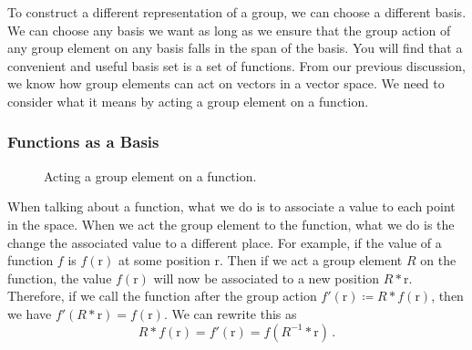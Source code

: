 \documentclass{article}
\theoremstyle{plain}\theoremheaderfont{\normalfont\itshape}\theorembodyfont{\rmfamily}\theoremseparator{.}\newtheorem*{rem}{Remark}\newtheorem*{ex}{Example}\newtheorem*{proof}{Proof}\newtheorem*{altp}{Alternative proof}
\theoremstyle{plain}\theoremheaderfont{\normalfont\bfseries}\theorembodyfont{\rmfamily}\theoremseparator{.}\newtheorem{thm}{Theorem}[section]\newtheorem{lem}[thm]{Lemma}\newtheorem{prop}[thm]{Proposition}\newtheorem*{cor}{Corollary}\newtheorem{defn}[thm]{Definition}\newtheorem{clm}[thm]{Claim}\newtheorem{clminproof}{Claim}\newtheorem*{law}{Law}\newtheorem{pos}[thm]{Postulate}
\theoremstyle{break}\theoremheaderfont{\normalfont\itshape}\theorembodyfont{\rmfamily}\theoremseparator{.\medskip}\newtheorem*{proofskip}{Proof}\newtheorem*{exs}{Examples}\newtheorem*{rems}{Remarks}
\theoremstyle{break}\theoremheaderfont{\normalfont\bfseries}\theorembodyfont{\rmfamily}\theoremseparator{.\medskip}\newtheorem{lemskip}[thm]{Lemma}\newtheorem{defnskip}[thm]{Definition}\newtheorem{propskip}[thm]{Proposition}\newtheorem{thmskip}[thm]{Theorem}
\numberwithin{equation}{section}
\newcommand{\vb}[1]{\bm{\mathrm{#1}}}
\begin{document}
    To construct a different representation of a group, we can choose a different basis. We can choose any basis we want as long as we ensure that the group action of any group element on any basis falls in the span of the basis. You will find that a convenient and useful basis set is a set of functions. From our previous discussion, we know how group elements can act on vectors in a vector space. We need to consider what it means by acting a group element on a function.

    \subsubsection{Functions as a Basis}
    \begin{figure}
        \centering
        \caption{Acting a group element on a function.}
    \end{figure}
    When talking about a function, what we do is to associate a value to each point in the space. When we act the group element to the function, what we do is the change the associated value to a different place. For example, if the value of a function \(f\) is \(f(\vb{r})\) at some position \(\vb{r}\). Then if we act a group element \(R\) on the function, the value \(f(\vb{r})\) will now be associated to a new position \(R*\vb{r}\). Therefore, if we call the function after the group action \(f'(\vb{r})\coloneqq R*f(\vb{r})\), then we have \(f'(R*\vb{r})=f(\vb{r})\). We can rewrite this as
    \begin{equation}
        R*f(\vb{r})=f'(\vb{r})=f(R^{-1}*\vb{r})\,.
    \end{equation}
    
\end{document}
